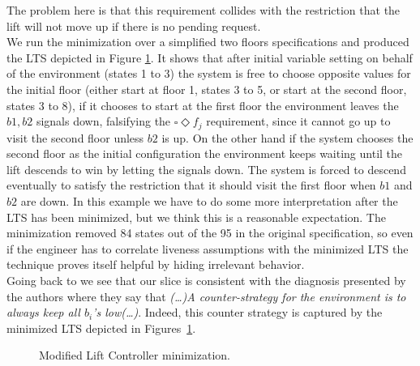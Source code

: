 The problem here is that this requirement collides with
the restriction that the lift will not move up if there
is no pending request.\\
We run the minimization over a simplified two floors
specifications and produced the LTS depicted in Figure
\ref{fig:lift-controller-minimization}.
It shows that after initial variable setting on behalf of the
environment (states 1 to 3) the system is free to choose 
opposite values for the initial floor (either start at
floor 1, states 3 to 5, or start at the second floor,
states 3 to 8), if it chooses to start at the first floor
the environment leaves the $b1, b2$ signals down, falsifying
the $\square \Diamond f_j$ requirement, since it cannot 
go up to visit the second floor unless $b2$ is up.  On the
other hand if the system chooses the second floor as the
initial configuration the environment keeps waiting until
the lift descends to win by letting the signals down.
The system is forced to descend eventually to satisfy
the restriction that it should visit the first floor when
$b1$ and $b2$ are down.  In this example we have to do
some more interpretation after the LTS has been minimized,
but we think this is a reasonable expectation.  The minimization removed 
84 states out of the 95 in the original specification, so
even if the engineer has to correlate liveness assumptions
with the minimized LTS 
the technique proves itself helpful by hiding
irrelevant behavior.\\
Going back to \cite{DBLP:conf/fmcad/AlurMT13} we see that our
slice is consistent with the diagnosis presented by the authors
where they say that \emph{(\ldots)A counter-strategy for the
environment is to always keep all $b_i$'s low(\ldots)}.
Indeed, this counter strategy is captured by the minimized 
LTS depicted in Figures~\ref{fig:lift-controller-minimization}.
\begin{figure}[bt]
\centering
\SmallPicture
{}
\vspace*{-2mm}
\caption{Modified Lift Controller minimization.}
\label{fig:lift-controller-minimization}
\vspace*{-4mm}
\MediumPicture
\end{figure}
